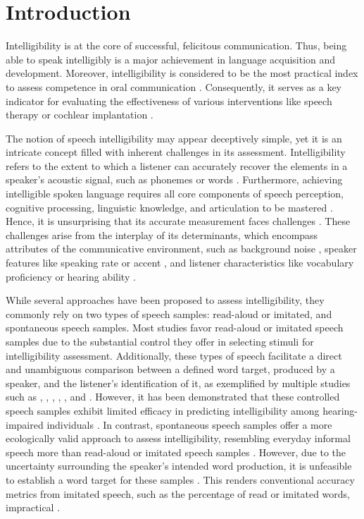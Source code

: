 \documentclass[
  authoryear,
  preprint,
  1p]{elsarticle}
\begin{document}
\section{Introduction}\label{sec-introduction}

Intelligibility is at the core of successful, felicitous communication.
Thus, being able to speak intelligibly is a major achievement in
language acquisition and development. Moreover, intelligibility is
considered to be the most practical index to assess competence in oral
communication \citep{Kent_et_al_1994}. Consequently, it serves as a key
indicator for evaluating the effectiveness of various interventions like
speech therapy or cochlear implantation \citep{Chin_et_al_2012}.

The notion of speech intelligibility may appear deceptively simple, yet
it is an intricate concept filled with inherent challenges in its
assessment. Intelligibility refers to the extent to which a listener can
accurately recover the elements in a speaker's acoustic signal, such as
phonemes or words
\citep{Freeman_et_al_2017, vanHeuven_2008, Whitehill_et_al_2004}.
Furthermore, achieving intelligible spoken language requires all core
components of speech perception, cognitive processing, linguistic
knowledge, and articulation to be mastered \citep{Freeman_et_al_2017}.
Hence, it is unsurprising that its accurate measurement faces challenges
\citep{Kent_et_al_1989}. These challenges arise from the interplay of
its determinants, which encompass attributes of the communicative
environment, such as background noise \citep{Munro_1998}, speaker
features like speaking rate \citep{Munro_et_al_1998} or accent
\citep{Jenkins_2000, Ockey_et_al_2016}, and listener characteristics
like vocabulary proficiency or hearing ability
\citep{Varonis_et_al_1985}.

While several approaches have been proposed to assess intelligibility,
they commonly rely on two types of speech samples: read-aloud or
imitated, and spontaneous speech samples. Most studies favor read-aloud
or imitated speech samples due to the substantial control they offer in
selecting stimuli for intelligibility assessment. Additionally, these
types of speech facilitate a direct and unambiguous comparison between a
defined word target, produced by a speaker, and the listener's
identification of it, as exemplified by multiple studies such as
\citet{Castellanos_et_al_2014}, \citet{Chin_et_al_2012},
\citet{Chin_et_al_2014}, \citet{Freeman_et_al_2017},
\citet{Khwaileh_et_al_2010}, and \citet{Montag_et_al_2014}. However, it
has been demonstrated that these controlled speech samples exhibit
limited efficacy in predicting intelligibility among hearing-impaired
individuals \citep{Cox_et_al_1989, Ertmer_2011}. {In contrast,
spontaneous speech samples offer a more ecologically valid approach to
assess intelligibility, resembling everyday informal speech more than
read-aloud or imitated speech samples \citep{Boonen_et_al_2021}.
However, due to the uncertainty surrounding the speaker's intended word
production, it is unfeasible to establish a word target for these
samples \citep{Flipsen_2006, Lagerberg_et_al_2014}. This renders
conventional accuracy metrics from imitated speech, such as the
percentage of read or imitated words, impractical
\citep{Boonen_et_al_2021}.}
\end{document}
